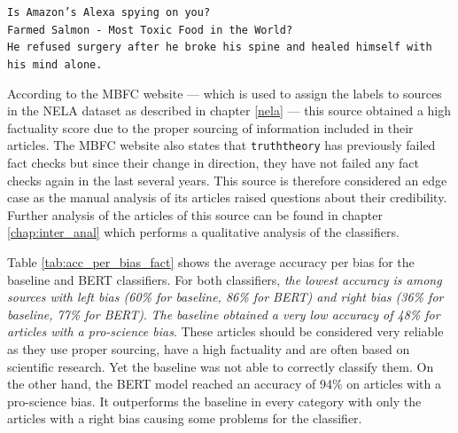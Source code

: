 \begin{center}
    \texttt{Is Amazon’s Alexa spying on you?} \\
    \texttt{Farmed Salmon - Most Toxic Food in the World?} \\
    \texttt{He refused surgery after he broke his spine and healed himself with his mind alone.} \\
\end{center}

According to the MBFC website --- which is used to assign the labels to sources in the NELA dataset as described in chapter \ref{nela} --- this source obtained a high factuality score due to the proper sourcing of information included in their articles. The MBFC website also states that \texttt{truththeory} has previously failed fact checks but since their change in direction, they have not failed any fact checks again in the last several years. This source is therefore considered an edge case as the manual analysis of its articles raised questions about their credibility. Further analysis of the articles of this source can be found in chapter \ref{chap:inter_anal} which performs a qualitative analysis of the classifiers.

Table \ref{tab:acc_per_bias_fact} shows the average accuracy per bias for the baseline and BERT classifiers. For both classifiers, \emph{the lowest accuracy is among sources with left bias (60\% for baseline, 86\% for BERT) and right bias (36\% for baseline, 77\% for BERT)}. \emph{The baseline obtained a very low accuracy of 48\% for articles with a pro-science bias}. These articles should be considered very reliable as they use proper sourcing, have a high factuality and are often based on scientific research. Yet the baseline was not able to correctly classify them. On the other hand, the BERT model reached an accuracy of 94\% on articles with a pro-science bias. It outperforms the baseline in every category with only the articles with a right bias causing some problems for the classifier. 


